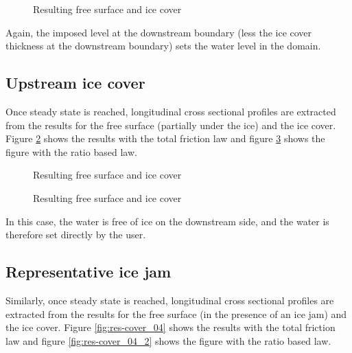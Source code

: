 \begin{figure}[H]
    \begin{center}
    \end{center}
    \caption{Resulting free surface and ice cover}
    \label{fig:res-cover_02_2}
\end{figure}

Again, the imposed level at the downstream boundary (less the ice cover thickness at the downstream boundary) sets the water level in the domain.

\subsection{Upstream ice cover}
Once steady state is reached, longitudinal cross sectional profiles are extracted from the results for the free surface (partially under the ice) and the ice cover.
Figure \ref{fig:res-cover_03} shows the results with the total friction law and figure \ref{fig:res-cover_03_2} shows the figure with the ratio based law.

\begin{figure}[H]
    \begin{center}
    \end{center}
    \caption{Resulting free surface and ice cover}
    \label{fig:res-cover_03}
\end{figure}

\begin{figure}[H]
    \begin{center}
    \end{center}
    \caption{Resulting free surface and ice cover}
    \label{fig:res-cover_03_2}
\end{figure}

In this case, the water is free of ice on the downstream side, and the water is therefore set directly by the user.

\subsection{Representative ice jam}
Similarly, once steady state is reached, longitudinal cross sectional profiles are extracted from the results for the free surface (in the presence of an ice jam) and the ice cover.
Figure \ref{fig:res-cover_04} shows the results with the total friction law and figure \ref{fig:res-cover_04_2} shows the figure with the ratio based law.

